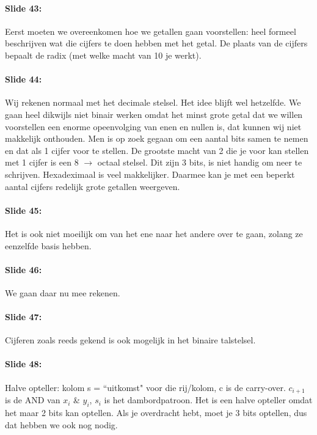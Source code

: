 \documentclass[10pt,a4paper]{book}
\begin{document}
\paragraph{Slide 43:} Eerst moeten we overeenkomen hoe we getallen gaan voorstellen: heel formeel beschrijven wat die cijfers te doen hebben met het getal. De plaats van de cijfers bepaalt de radix (met welke macht van 10 je werkt). 

\paragraph{Slide 44:} Wij rekenen normaal met het decimale stelsel. Het idee blijft wel hetzelfde. We gaan heel dikwijls niet binair werken omdat het minst grote getal dat we willen voorstellen een enorme opeenvolging van enen en nullen is, dat kunnen wij niet makkelijk onthouden. Men is op zoek gegaan om een aantal bits samen te nemen en dat als 1 cijfer voor te stellen. De grootste macht van 2 die je voor kan stellen met 1 cijfer is een 8 $\rightarrow$ octaal stelsel. Dit zijn 3 bits, is niet handig om neer te schrijven. Hexadeximaal is veel makkelijker. Daarmee kan je met een beperkt aantal cijfers redelijk grote getallen weergeven.

\paragraph{Slide 45:} Het is ook niet moeilijk om van het ene naar het andere over te gaan, zolang ze eenzelfde basis hebben.

\paragraph{Slide 46:} We gaan daar nu mee rekenen. 

\paragraph{Slide 47:} Cijferen zoals reeds gekend is ook mogelijk in het binaire talstelsel.

\paragraph{Slide 48:} Halve opteller: kolom s = ``uitkomst" voor die rij/kolom, c is de carry-over. $c_{i+1}$ is de AND van $x_i$ \& $y_i$, $s_i$ is het dambordpatroon. Het is een halve opteller omdat het maar 2 bits kan optellen. Als je overdracht hebt, moet je 3 bits optellen, dus dat hebben we ook nog nodig. 
\end{document}
